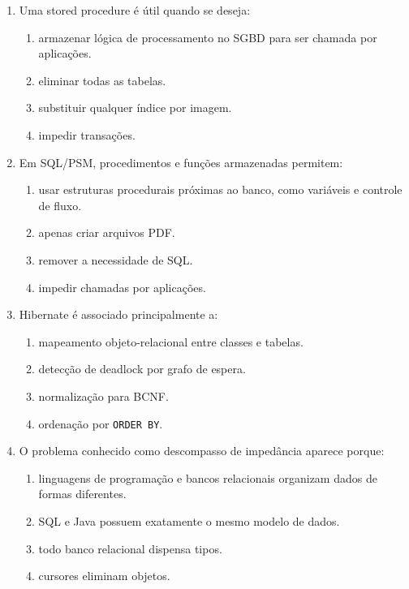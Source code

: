\documentclass[12pt,a4paper]{article}
\begin{document}
\begin{enumerate}[resume,label=\textbf{Q\arabic*.}]
\item Uma stored procedure é útil quando se deseja:

\begin{enumerate}[label=\alph*)]
    \item armazenar lógica de processamento no SGBD para ser chamada por aplicações.
    \item eliminar todas as tabelas.
    \item substituir qualquer índice por imagem.
    \item impedir transações.
\end{enumerate}

\item Em SQL/PSM, procedimentos e funções armazenadas permitem:

\begin{enumerate}[label=\alph*)]
    \item usar estruturas procedurais próximas ao banco, como variáveis e controle de fluxo.
    \item apenas criar arquivos PDF.
    \item remover a necessidade de SQL.
    \item impedir chamadas por aplicações.
\end{enumerate}

\item Hibernate é associado principalmente a:

\begin{enumerate}[label=\alph*)]
    \item mapeamento objeto-relacional entre classes e tabelas.
    \item detecção de deadlock por grafo de espera.
    \item normalização para BCNF.
    \item ordenação por \texttt{ORDER BY}.
\end{enumerate}

\item O problema conhecido como descompasso de impedância aparece porque:

\begin{enumerate}[label=\alph*)]
    \item linguagens de programação e bancos relacionais organizam dados de formas diferentes.
    \item SQL e Java possuem exatamente o mesmo modelo de dados.
    \item todo banco relacional dispensa tipos.
    \item cursores eliminam objetos.
\end{enumerate}


\end{enumerate}
\end{document}
